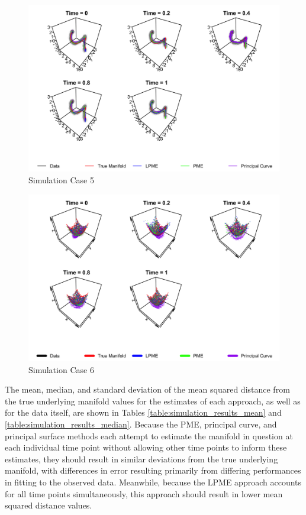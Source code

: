 \documentclass[11pt,reqno]{article}
\renewcommand{\textwidth}{180mm}
\theoremstyle{definition}
\begin{document}
\begin{figure}[h]
  \centering
  \includegraphics[width=\textwidth]{sim_case5}
  \caption{Simulation Case 5}
  \label{fig:sim_case4}
\end{figure}

\begin{figure}[h]
  \centering
  \includegraphics[width=\textwidth]{sim_case7}
  \caption{Simulation Case 6}
  \label{fig:sim_case6}
\end{figure}

The mean, median, and standard deviation of the mean squared distance from the true underlying manifold values for the estimates of each approach, as well as for the data itself, are shown in Tables \ref{table:simulation_results_mean} and \ref{table:simulation_results_median}. Because the PME, principal curve, and principal surface methods each attempt to estimate the manifold in question at each individual time point without allowing other time points to inform these estimates, they should result in similar deviations from the true underlying manifold, with differences in error resulting primarily from differing performances in fitting to the observed data. Meanwhile, because the LPME approach accounts for all time points simultaneously, this approach should result in lower mean squared distance values.
\end{document}
